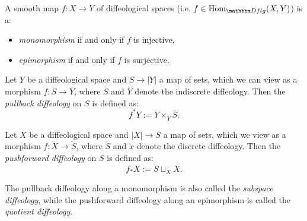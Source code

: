 \documentclass[a4paper,11pt]{article}  %
\newcommand{\Dflg}{\cat[Dflg]}
\begin{document}
\begin{proposition}
A smooth map \(f: X \to Y\) of diffeological spaces (i.e. $f \in \Hom_{\Dflg}(X,Y)$) is a:
\begin{itemize}
    \item \emph{monomorphism} if and only if \(f\) is injective,
    \item \emph{epimorphism} if and only if \(f\) is surjective.
\end{itemize}
\end{proposition}


\begin{definition}
Let \(Y\) be a diffeological space and \(S \to |Y|\) a map of sets, which we can view as a morphism \(f : \overline{S}  \to \overline{Y}\), where \(\overline{S} \) and \(\overline{Y} \) denote the indiscrete diffeology. Then the \emph{pullback diffeology} on \(S\) is defined as:
$$
f^*Y := Y \times_{\overline{Y}} \overline{S}.
$$
\end{definition}

\begin{definition}
Let \(X\) be a diffeological space and \(|X| \to S\) a map of sets, which we view as a morphism \(f : \ddot{X} \to \ddot{S}\), where \(\ddot{S}\) and \(\ddot{x}\) denote the discrete diffeology. Then the \emph{pushforward diffeology} on \(S\) is defined as:
$$
f_*X := \ddot{S}  \sqcup_{\ddot{X}} X.
$$
\end{definition}

\begin{definition}
The pullback diffeology along a monomorphism is also called the \emph{subspace diffeology}, while the pushforward diffeology along an epimorphism is called the \emph{quotient diffeology}.
\end{definition}
\end{document}
